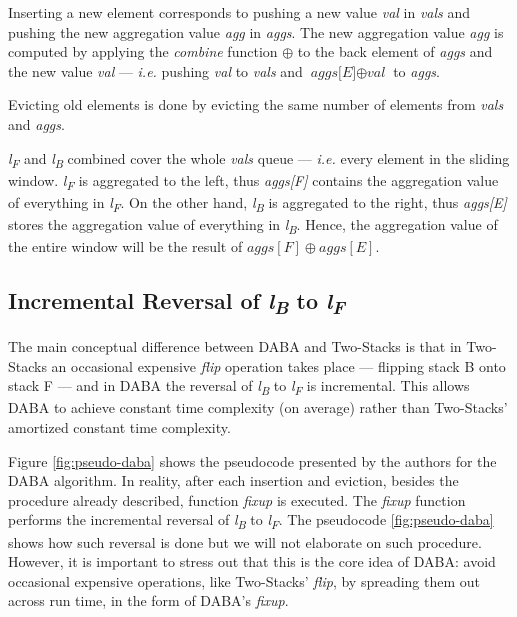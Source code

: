Inserting a new element corresponds to pushing a new value \textit{val} in \textit{vals} and pushing the new aggregation value \textit{agg} in \textit{aggs}. The new aggregation value \textit{agg} is computed by applying the \textit{combine} function $\oplus$ to the back element of \textit{aggs} and the new value \textit{val} --- \textit{i.e.} pushing \textit{val} to \textit{vals} and $\textit{aggs[E]} \oplus \textit{val}$ to \textit{aggs}. 

Evicting old elements is done by evicting the same number of elements from \textit{vals} and \textit{aggs}.

\textit{l\textsubscript{F}} and \textit{l\textsubscript{B}} combined cover the whole \textit{vals} queue --- \textit{i.e.} every element in the sliding window. \textit{l\textsubscript{F}} is aggregated to the left, thus \textit{aggs[F]} contains the aggregation value of everything in \textit{l\textsubscript{F}}. On the other hand, \textit{l\textsubscript{B}} is aggregated to the right, thus \textit{aggs[E]} stores the aggregation value of everything in \textit{l\textsubscript{B}}. Hence, the aggregation value of the entire window will be the result of \textit{$aggs[F] \oplus aggs[E]$}.


\subsection*{Incremental Reversal of \textit{l\textsubscript{B}} to \textit{l\textsubscript{F}}}

The main conceptual difference between DABA and Two-Stacks is that in Two-Stacks an occasional expensive \textit{flip} operation takes place --- flipping stack B onto stack F --- and in DABA the reversal of \textit{l\textsubscript{B}} to \textit{l\textsubscript{F}} is incremental. This allows DABA to achieve constant time complexity (on average) rather than Two-Stacks' amortized constant time complexity.

Figure \ref{fig:pseudo-daba} shows the pseudocode presented by the authors for the DABA algorithm. In reality, after each insertion and eviction, besides the procedure already described, function \textit{fixup} is executed. The \textit{fixup} function performs the incremental reversal of \textit{l\textsubscript{B}} to \textit{l\textsubscript{F}}. The pseudocode \ref{fig:pseudo-daba} shows how such reversal is done but we will not elaborate on such procedure. However, it is important to stress out that this is the core idea of DABA: avoid occasional expensive operations, like Two-Stacks' \textit{flip}, by spreading them out across run time, in the form of DABA's \textit{fixup}.

